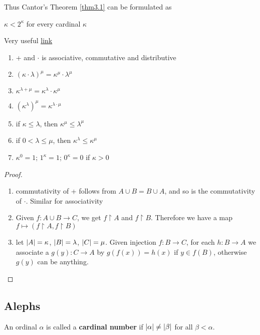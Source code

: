 \documentclass[11pt]{article}
\begin{document}
Thus Cantor's Theorem \ref{thm3.1} can be formulated as
\begin{quoting}
\(\kappa<2^\kappa\) for every cardinal \(\kappa\)
\end{quoting}

Very useful \href{https://math.stackexchange.com/questions/131212/overview-of-basic-results-on-cardinal-arithmetic}{link}

\begin{proposition}[]
\begin{enumerate}
\item + and \(\cdot\) is associative, commutative and distributive
\item \((\kappa\cdot\lambda)^\mu=\kappa^\mu\cdot\lambda^\mu\)
\item \(\kappa^{\lambda+\mu}=\kappa^\lambda\cdot\kappa^\mu\)
\item \((\kappa^\lambda)^\mu=\kappa^{\lambda\cdot\mu}\)
\item if \(\kappa\le\lambda\), then \(\kappa^\mu\le\lambda^\mu\)
\item if \(0<\lambda\le\mu\), then \(\kappa^\lambda\le\kappa^\mu\)
\item \(\kappa^0=1\); \(1^\kappa=1\); \(0^\kappa=0\) if \(\kappa>0\)
\end{enumerate}
\end{proposition}

\begin{proof}
\begin{enumerate}
\item commutativity of + follows from \(A\cup B=B\cup A\), and so is the commutativity of \(\cdot\). Similar
for associativity
\setcounter{enumi}{2}
\item Given \(f:A\cup B\to C\), we get \(f\restriction A\) and \(f\restriction B\). Therefore we
have a map \(f\mapsto(f\restriction A,f\restriction B)\)
\setcounter{enumi}{5}
\item let \(\abs{A}=\kappa\), \(\abs{B}=\lambda\), \(\abs{C}=\mu\). Given injection \(f:B\to C\), for
each \(h:B\to A\) we associate a \(g(y):C\to A\) by \(g(f(x))=h(x)\) if \(y\in f(B)\),
otherwise \(g(y)\) can be anything.
\end{enumerate}
\end{proof}

\subsection{Alephs}
\label{sec:org8ed661b}
An ordinal \(\alpha\) is called a \textbf{cardinal number} if \(\abs{\alpha}\neq\abs{\beta}\) for all \(\beta<\alpha\).
\end{document}
